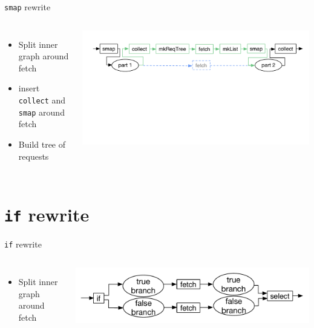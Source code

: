 \documentclass[utf8x,10pt,aspectratio=169]{beamer}
\begin{document}
\addtocounter{framenumber}{-1}

\begin{frame}{\texttt{smap} rewrite}
	\begin{columns}

		\begin{itemize}
			\item Split inner graph around fetch
			\item insert \texttt{collect} and \texttt{smap} around fetch
			\item<2-> Build tree of requests
		\end{itemize}
		\includegraphics[width=\textwidth]{graphs/smap-rewrite}
	\end{columns}
		
\end{frame}

\section{\texttt{if} rewrite}

\begin{frame}{\texttt{if} rewrite}
	\begin{columns}
		\column{0.4\textwidth}
		\begin{itemize}[<+->]
			\item Split inner graph around fetch
		\end{itemize}
		\column{0.6\textwidth}
		\includegraphics[width=\textwidth]{graphs/basic-if-rewrite-original}
	\end{columns}
\end{frame}
\end{document}
